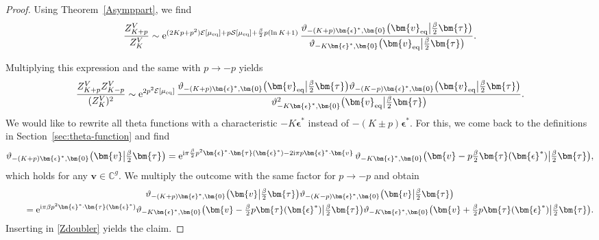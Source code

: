 \documentclass[10pt,a4paper]{amsart}
\numberwithin{equation}{section}
\begin{document}
\begin{proof}
Using Theorem~\ref{Asymppart}, we find
\[
\frac{Z_{K + p}^{V}}{Z_K^V} \sim{\rm e}^{(2Kp + p^2)\mathcal{E}[\mu_{{\rm eq}}] + p \mathcal{S}[\mu_{{\rm eq}}] + \frac{\beta}{2}p(\ln K + 1)}\,\frac{\vartheta_{-(K + p)\bm{\epsilon}^*,\bm{0}}\bigl(\bm{v}_{{\rm eq}}\big|\frac{\beta}{2}\bm{\tau}\bigr)}{\vartheta_{-K\bm{\epsilon}^*,\bm{0}}\bigl(\bm{v}_{{\rm eq}}\big|\frac{\beta}{2}\bm{\tau}\bigr)}.
\]

Multiplying this expression and the same with $p \rightarrow -p$ yields
\begin{equation}
 \label{Zdoubler}
	\frac{Z_{K + p}^{V}Z_{K - p}^{V}}{(Z_K^V)^2} \sim{\rm e}^{2p^2\mathcal{E}[\mu_{{\rm eq}}]}\,\frac{\vartheta_{-(K + p)\bm{\epsilon}^*,\bm{0}}\bigl(\bm{v}_{{\rm eq}}\big|\frac{\beta}{2}\bm{\tau}\bigr)\vartheta_{-(K - p)\bm{\epsilon}^*,\bm{0}}\bigl(\bm{v}_{{\rm eq}}\big|\frac{\beta}{2}\bm{\tau}\bigr)}{\vartheta^2_{-K\bm{\epsilon}^*,\bm{0}}\bigl(\bm{v}_{{\rm eq}}\big|\frac{\beta}{2}\bm{\tau}\bigr)}.
\end{equation}
We would like to rewrite all theta functions with a characteristic $-K\bm{\epsilon}^*$ instead of $-(K \pm p)\bm{\epsilon}^*$. For this, we come back to the definitions in Section~\ref{sec:theta-function} and find
\begin{equation}
\label{thetashift}
\vartheta_{-(K + p)\bm{\epsilon}^*,\bm{0}}\bigl(\bm{v}\big|\tfrac{\beta}{2}\bm{\tau}\bigr) ={\rm e}^{{\rm i}\pi \frac{\beta}{2} p^2 \bm{\epsilon}^* \cdot \bm{\tau}(\bm{\epsilon}^*) - 2{\rm i}\pi p \bm{\epsilon}^* \cdot \bm{v}}\,\vartheta_{-K\bm{\epsilon}^*,\bm{0}}\bigl(\bm{v} - p\tfrac{\beta}{2}\bm{\tau}(\bm{\epsilon}^*)\big|\tfrac{\beta}{2}\bm{\tau}\bigr),
\end{equation}
which holds for any $\bm{v} \in \mathbb{C}^g$. We multiply the outcome with the same factor for $p \rightarrow -p$ and obtain
\begin{gather*}
 \vartheta_{-(K + p)\bm{\epsilon}^*,\bm{0}}\bigl(\bm{v}\big|\tfrac{\beta}{2}\bm{\tau}\bigr)\vartheta_{-(K - p)\bm{\epsilon}^*,\bm{0}}\bigl(\bm{v}\big|\tfrac{\beta}{2}\bm{\tau}\bigr) \\
\qquad{} ={\rm e}^{{\rm i}\pi \beta p^2 \bm{\epsilon}^* \cdot \bm{\tau}(\bm{\epsilon}^*)}\vartheta_{-K\bm{\epsilon}^*,\bm{0}}\bigl(\bm{v} - \tfrac{\beta}{2}p\bm{\tau}(\bm{\epsilon}^*)\big|\tfrac{\beta}{2}\bm{\tau}\bigr) \vartheta_{-K\bm{\epsilon}^*,\bm{0}}\bigl(\bm{v} + \tfrac{\beta}{2} p \bm{\tau}(\bm{\epsilon}^*)\big|\tfrac{\beta}{2}\bm{\tau}\bigr).
\end{gather*}
Inserting in \eqref{Zdoubler} yields the claim.
\end{proof}
\end{document}
